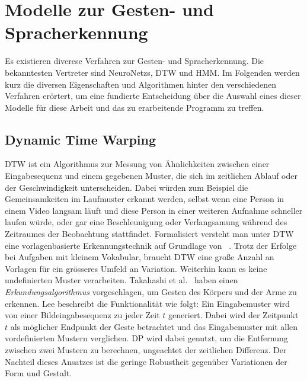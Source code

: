 \chapter{Modelle zur Gesten- und Spracherkennung}
\label{chap:Modelle}
Es existieren diverese Verfahren zur Gesten- und Spracherkennung. Die bekanntesten Vertreter sind \glspl{NeuroNetz}, \gls{DTW} und \gls{HMM}.
\newline
Im Folgenden werden kurz die diversen Eigenschaften und Algorithmen hinter den verschiedenen Verfahren er\"ortert, um eine fundierte Entscheidung \"uber die Auswahl eines dieser Modelle f\"ur diese Arbeit und das zu erarbeitende Programm zu treffen.

\section{Dynamic Time Warping}
\gls{DTW} ist ein Algorithmus zur Messung von \"Ahnlichkeiten zwischen einer Eingabesequenz und einem gegebenen Muster, die sich im zeitlichen Ablauf oder der Geschwindigkeit unterscheiden. Dabei w\"urden zum Beispiel die Gemeinsamkeiten im Laufmuster erkannt werden, selbst wenn eine Person in einem Video langsam l\"auft und diese Person in einer weiteren Aufnahme schneller laufen w\"urde, oder gar eine Beschleunigung oder Verlangsamung w\"ahrend des Zeitraumes der Beobachtung stattfindet.
\newline
Formalisiert versteht man unter \acrshort{DTW} eine vorlagenbasierte Erkennungstechnik auf Grundlage von ~\cite[S.~963]{bib:hmmlee}.
Trotz der Erfolge bei Aufgaben mit kleinem Vokabular, braucht \acrshort{DTW} eine gro\ss e Anzahl an Vorlagen f\"ur ein gr\"osseres Umfeld an Variation. Weiterhin kann es keine undefinierten Muster verarbeiten.
\newline
Takahashi et al.~\cite{bib:takahashi} haben einen \textit{Erkundungsalgorithmus} vorgeschlagen, um Gesten des K\"orpers und der Arme zu erkennen. Lee beschreibt die Funktionalit\"at wie folgt: Ein Eingabemuster wird von einer Bildeingabesequenz zu jeder Zeit $t$ generiert. Dabei wird der Zeitpunkt $t$ als m\"oglicher Endpunkt der Geste betrachtet und das Eingabemuster mit allen vordefinierten Mustern verglichen. \gls{DP} wird dabei genutzt, um die Entfernung zwischen zwei Mustern zu berechnen, ungeachtet der zeitlichen Differenz.
\newline
Der Nachteil dieses Ansatzes ist die geringe Robustheit gegen\"uber Variationen der Form und Gestalt.

